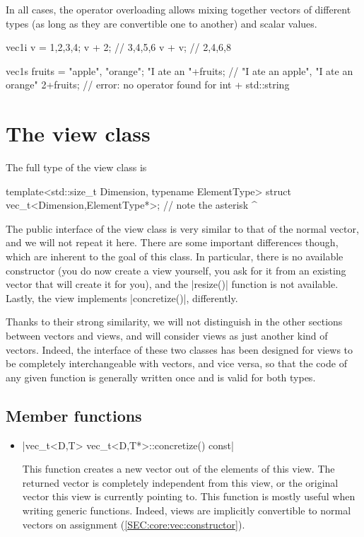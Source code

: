 \documentclass[12pt]{report}
\newenvironment{example}
{
    \begin{mdframed}[style=example,frametitle={Example}]
}
{
    \end{mdframed}
}
\begin{document}
In all cases, the operator overloading allows mixing together vectors of different types (as long as they are convertible one to another) and scalar values.

\begin{example}
\begin{cppcode}
vec1i v = {1,2,3,4};
v + 2; // {3,4,5,6}
v + v; // {2,4,6,8}

vec1s fruits = {"apple", "orange"};
"I ate an "+fruits; // {"I ate an apple", "I ate an orange"}
2+fruits;           // error: no operator found for int + std::string
\end{cppcode}
\end{example}

\section{The view class \label{SEC:core:view}}

The full type of the view class is
\begin{cppcode}
template<std::size_t Dimension, typename ElementType>
struct vec_t<Dimension,ElementType*>;
//              note the asterisk ^
\end{cppcode}

The public interface of the view class is very similar to that of the normal vector, and we will not repeat it here. There are some important differences though, which are inherent to the goal of this class. In particular, there is no available constructor (you do now create a view yourself, you ask for it from an existing vector that will create it for you), and the \cppinline|resize()| function is not available. Lastly, the view implements \cppinline|concretize()|, differently.

Thanks to their strong similarity, we will not distinguish in the other sections between vectors and views, and will consider views as just another kind of vectors. Indeed, the interface of these two classes has been designed for views to be completely interchangeable with vectors, and vice versa, so that the code of any given function is generally written once and is valid for both types.

\subsection{Member functions \label{SEC:core:view:member_fun}}

\begin{itemize}
\item \cppinline|vec_t<D,T> vec_t<D,T*>::concretize() const|

This function creates a new vector out of the elements of this view. The returned vector is completely independent from this view, or the original vector this view is currently pointing to. This function is mostly useful when writing generic functions. Indeed, views are implicitly convertible to normal vectors on assignment (\ref{SEC:core:vec:constructor}).
\end{itemize}
\end{document}
